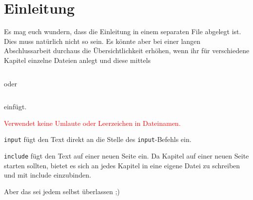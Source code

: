 \chapter{Einleitung}
Es mag euch wundern, dass die Einleitung in einem separaten File abgelegt ist. Dies muss natürlich nicht so sein. Es könnte aber bei einer langen Abschlussarbeit durchaus die Übersichtlichkeit erhöhen, wenn ihr für verschiedene Kapitel einzelne Dateien anlegt und diese mittels 
\begin{verbatim}\end{verbatim}

\bigskip
oder

\bigskip
\begin{verbatim}\end{verbatim}
einfügt.

\bigskip
\noindent\textcolor{red}{Verwendet keine Umlaute oder Leerzeichen in Dateinamen.}

\noindent\texttt{input} fügt den Text direkt an die Stelle des \texttt{input}-Befehls ein.

\noindent\texttt{include} fügt den Text auf einer neuen Seite ein. Da Kapitel auf einer neuen Seite
starten sollten, bietet es sich an jedes Kapitel in eine eigene Datei zu schreiben und mit
include einzubinden.

Aber das sei jedem selbst überlassen ;)

